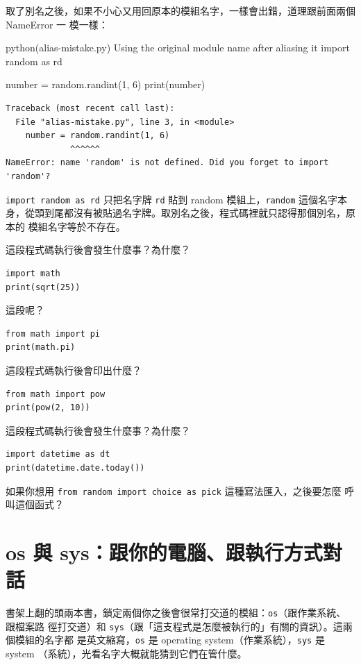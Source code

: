 取了別名之後，如果不小心又用回原本的模組名字，一樣會出錯，道理跟前面兩個 NameError 一
模一樣：

\begin{example}{python}{(alias-mistake.py) Using the original module name after aliasing it}
import random as rd

number = random.randint(1, 6)
print(number)
\end{example}

\begin{verbatim}
Traceback (most recent call last):
  File "alias-mistake.py", line 3, in <module>
    number = random.randint(1, 6)
             ^^^^^^
NameError: name 'random' is not defined. Did you forget to import 'random'?
\end{verbatim}

\texttt{import random as rd} 只把名字牌 \texttt{rd} 貼到 random 模組上，\texttt{random}
這個名字本身，從頭到尾都沒有被貼過名字牌。取別名之後，程式碼裡就只認得那個別名，原本的
模組名字等於不存在。

\begin{drills}[label=drills:import-syntax]
\item 這段程式碼執行後會發生什麼事？為什麼？
\begin{verbatim}
import math
print(sqrt(25))
\end{verbatim}
\item 這段呢？
\begin{verbatim}
from math import pi
print(math.pi)
\end{verbatim}
\item 這段程式碼執行後會印出什麼？
\begin{verbatim}
from math import pow
print(pow(2, 10))
\end{verbatim}
\item 這段程式碼執行後會發生什麼事？為什麼？
\begin{verbatim}
import datetime as dt
print(datetime.date.today())
\end{verbatim}
\item 如果你想用 \texttt{from random import choice as pick} 這種寫法匯入，之後要怎麼
呼叫這個函式？
\end{drills}

\section{os 與 sys：跟你的電腦、跟執行方式對話}
\label{sec:os-and-sys}

書架上翻的頭兩本書，鎖定兩個你之後會很常打交道的模組：\texttt{os}（跟作業系統、跟檔案路
徑打交道）和 \texttt{sys}（跟「這支程式是怎麼被執行的」有關的資訊）。這兩個模組的名字都
是英文縮寫，\texttt{os} 是 operating system（作業系統），\texttt{sys} 是 system
（系統），光看名字大概就能猜到它們在管什麼。

